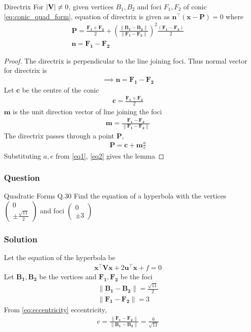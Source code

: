 \documentclass{beamer}
\newcommand{\myvec}[1]{\ensuremath{\begin{pmatrix}#1\end{pmatrix}}}
\providecommand{\brak}[1]{\ensuremath{\left(#1\right)}}
\let\vec\mathbf
\newcommand\norm[1]{\left\lVert#1\right\rVert}
\renewcommand{\vec}[1]{\mathbf{#1}}
\begin{document}
\begin{frame}{Directrix}
For $\abs{\vec{V}} \ne 0$, given vertices $B_1,B_2$ and foci $F_1,F_2$ of conic \eqref{eq:conic_quad_form}, equation of directrix is given as $\vec{n}^{\top}\brak{\vec{x} - \vec{P}} = 0$ where
\begin{align}
    \vec{P} = \frac{\vec{F_1}+\vec{F_2}}{2} + \brak{\frac{\norm{\vec{B_1}-\vec{B_2}}}{\norm{\vec{F_1}-\vec{F_2}}}}^2 \frac{\brak{\vec{F_1}-\vec{F_2}}}{2}\\
    \vec{n} = \vec{F_1}-\vec{F_2}
\end{align}
\end{frame}
\begin{frame}{}
\begin{proof}
The directrix is perpendicular to the line joining foci. Thus normal vector for directrix is
\begin{align}
    \implies \vec{n} = \vec{F_1}-\vec{F_2}
\end{align}
Let $\vec{c}$ be the centre of the conic
\begin{align}
    \vec{c} = \frac{\vec{F_1}+\vec{F_2}}{2}
\end{align}
$\vec{m}$ is the unit direction vector of line joining the foci
\begin{align}
    \vec{m} = \frac{\vec{F_1}-\vec{F_2}}{\norm{\vec{F_1}-\vec{F_2}}}
\end{align}
The directrix passes through a point $\vec{P}$,
\begin{align}
    \vec{P} = \vec{c} + \vec{m}\frac{a}{e}
\end{align}
Substituting $a,e$ from \eqref{eq1}, \eqref{eq2} gives the lemma
\end{proof}
\end{frame}

\begin{frame}
\frametitle{Question}
\begin{block}{Quadratic Forms Q.30}
Find the equation of a hyperbola with the vertices \myvec{0\\\pm \frac{\sqrt{11}}{2}} and foci \myvec{0\\\pm 3}
\end{block}
\end{frame}

\begin{frame}
\frametitle{Solution}
Let the equation of the hyperbola be
\begin{align}
     \vec{x}^{\top}\vec{V}\vec{x}+2\vec{u}^{\top}\vec{x}+f=0
\end{align}
Let $\vec{B_1}, \vec{B_2}$ be the vertices and $\vec{F_1}, \vec{F_2}$ be the foci
\begin{align}
    \norm{\vec{B_1}-\vec{B_2}} = \frac{\sqrt{11}}{2}\\
    \norm{\vec{F_1}-\vec{F_2}} = 3
\end{align}
From \eqref{eq:eccentricity} eccentricity,
\begin{align}
    e = \frac{\norm{\vec{F_1}-\vec{F_2}}}{\norm{\vec{B_1}-\vec{B_2}}} = \frac{6}{\sqrt{11}} 
\end{align}
\end{frame}
\end{document}
